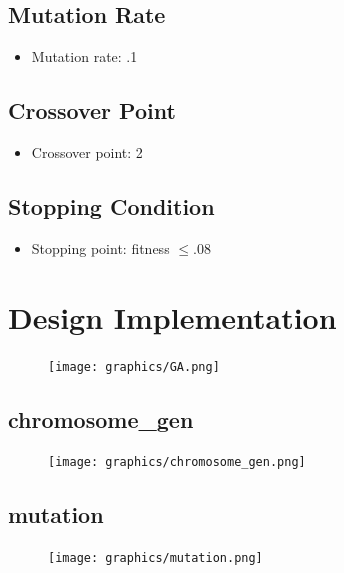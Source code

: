 \documentclass{article}
\begin{document}
    \subsection{Mutation Rate}
    \begin{itemize}
        \item Mutation rate: .1
    \end{itemize}
    \subsection{Crossover Point}
    \begin{itemize}
        \item Crossover point: 2
    \end{itemize}
    \subsection{Stopping Condition}
    \begin{itemize}
        \item Stopping point: fitness \(\leq .08\)
    \end{itemize}

\setcounter{section}{2}
\clearpage
\section{Design Implementation}
    \begin{figure}[h!]
        \begin{center}
            \texttt{[image: graphics/GA.png]}
        \end{center}                
    \end{figure}   
    \newpage
    \subsection{chromosome\_gen}
        \begin{figure}[h!]
            \begin{center}
                \texttt{[image: graphics/chromosome\_gen.png]}
            \end{center}                
        \end{figure}   
    \subsection{mutation}
    \begin{figure}[h!]
        \begin{center}
            \texttt{[image: graphics/mutation.png]}
        \end{center}                
    \end{figure}  
    \newpage 
\end{document}
